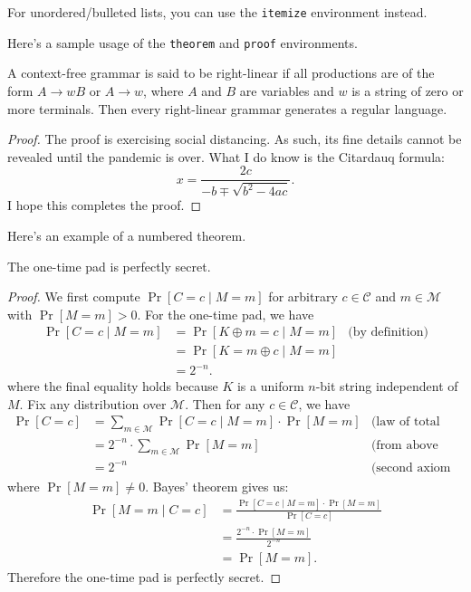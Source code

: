 \documentclass[12pt]{article}
\begin{document}
For unordered/bulleted lists, you can use the \verb|itemize| environment instead.

Here's a sample usage of the \texttt{theorem} and \texttt{proof} environments.

\begin{theorem*}
A context-free grammar is said to be right-linear if all productions are of the form $A \rightarrow wB$ or $A \rightarrow w$, where $A$ and $B$ are variables and $w$ is a string of zero or more terminals. Then every right-linear grammar generates a regular language.
\end{theorem*}
\begin{proof}
The proof is exercising social distancing. As such, its fine details cannot be revealed until the pandemic is over. What I do know is the Citardauq formula:
\[
    x = \frac{2c}{-b \mp \sqrt{b^2 - 4ac}}.
\]
I hope this completes the proof.
\end{proof}

Here's an example of a numbered theorem.
\begin{theorem}
    The one-time pad is perfectly secret.
\end{theorem}
\begin{proof}
    We first compute $\Pr[C = c \mid M = m]$ for arbitrary $c \in \mathcal{C}$ and $m \in \mathcal{M}$ with $\Pr[M = m] > 0$. For the one-time pad, we have
    \begin{align*}
        \Pr[C = c \mid M = m] &= \Pr[K \oplus m = c \mid M = m] & \text{(by definition)} \\
        &= \Pr[K = m \oplus c \mid M = m] \\
        &= 2^{-n}.
    \end{align*}
    where the final equality holds because $K$ is a uniform $n$-bit string independent of $M$. 
    Fix any distribution over $\mathcal{M}$. Then for any $c \in \mathcal{C}$, we have
    \begin{align*}
        \Pr[C = c] &= \sum_{m \in \mathcal{M}} \Pr[C = c \mid M = m] \cdot \Pr[M = m] & \text{(law of total probability)} \\
        &= 2^{-n} \cdot \sum_{m \in \mathcal{M}} \Pr[M = m] & \text{(from above result)} \\
        &= 2^{-n} & \text{(second axiom of probability)}
    \end{align*}
    where $\Pr[M = m] \ne 0$.
    Bayes' theorem gives us:
    \begin{align*}
        \Pr[M = m \mid C = c] &= \frac{\Pr[C = c \mid M = m] \cdot \Pr[M = m]}{\Pr[C = c]} \\
        &= \frac{2^{-n} \cdot \Pr[M = m]}{2^{-n}} \\
        &= \Pr[M = m].
    \end{align*}
    Therefore the one-time pad is perfectly secret.
\end{proof}
\end{document}
